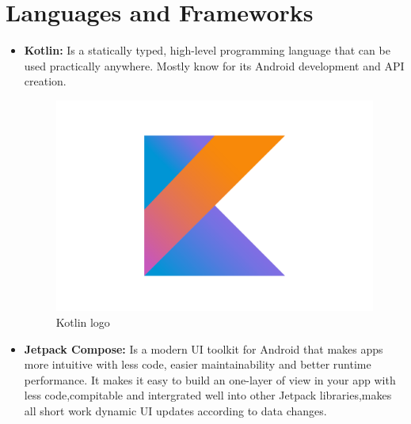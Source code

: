 \section{Languages and Frameworks}
\begin{itemize}
    \item \textbf{Kotlin:} Is a statically typed, high-level programming language that can be used practically anywhere. Mostly know for its Android development and API creation.
        \begin{figure}[H] 
            \centering
            \includegraphics[scale=0.04]{logos/kotlin-logo.png}
            \caption{Kotlin logo } 
            \label{fig: Kotlin logo}
        \end{figure}
    \item \textbf{Jetpack Compose:} Is a modern UI toolkit for Android that makes apps more intuitive with less code, easier maintainability and better runtime performance. It makes it easy to build an one-layer of view in your app with less code,compitable and intergrated well into other Jetpack libraries,makes all short work dynamic UI updates according to data changes.
        \begin{figure}[H] 
            \centering

\end{figure}
\end{itemize}
